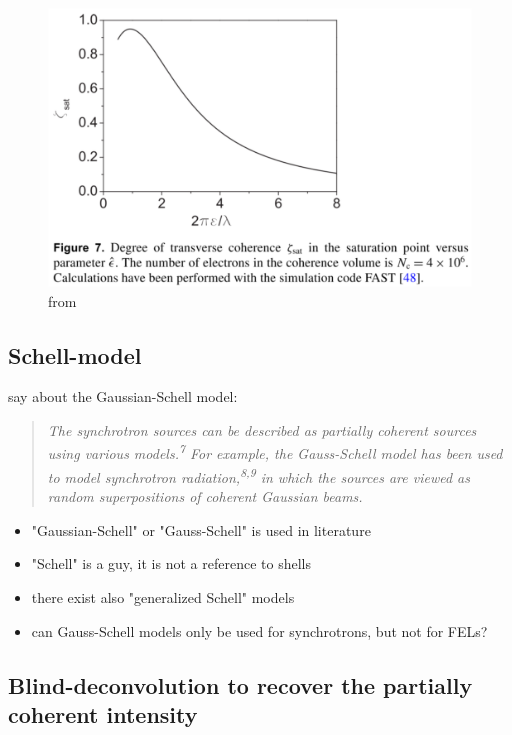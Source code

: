 \documentclass{article}
\newenvironment{itquotation}
{\begin{quotation}\itshape}
	{\end{quotation}}
\begin{document}
\begin{figure}[h]
	\centering
	\includegraphics[width=0.7\linewidth]{SaldinSchneidmillerYurkov2010fig7.png}
	\caption{from \cite{SaldinSchneidmillerYurkov2010}}
	\label{fig:saldinschneidmilleryurkov2010fig7}
\end{figure}


\subsection{Schell-model}

\cite[(p. 1, para. 2)]{BurdetShimomuraHiroseEtAl2016} say about the Gaussian-Schell model:

\begin{itquotation}The synchrotron sources can be described as partially coherent sources using various models.\textsuperscript{7} For example, the Gauss-Schell model has been used to model synchrotron radiation,\textsuperscript{8,9} in which the sources are viewed as random superpositions of coherent Gaussian beams.
\end{itquotation}

\begin{itemize}
	\item "Gaussian-Schell" or "Gauss-Schell" is used in literature
	\item "Schell" is a guy, it is not a reference to shells
	\item there exist also "generalized Schell" models
	\item can Gauss-Schell models only be used for synchrotrons, but not for FELs?
\end{itemize}



\cite{BartelsPaulGreenEtAl2002}

\subsection{Blind-deconvolution to recover the partially coherent intensity}
\end{document}
